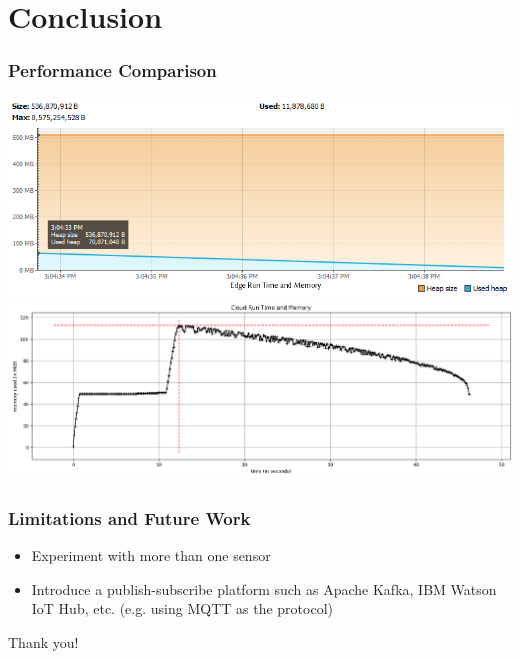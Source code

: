 \documentclass[xelatex,usenames,dvipsnames]{beamer}
\begin{document}
  \section{Conclusion}
  \begin{frame}[standout]
    \frametitle{Performance Comparison}
    
    \includegraphics[width = \textwidth]{figs/Edgent_Run_Time_Memory.png}
    \includegraphics[width = \textwidth]{figs/Cloud_Run_Time_Memory.png}
    
  
  \end{frame}

  \begin{frame}
    \frametitle{Limitations and Future Work}
    \begin{itemize}
      \item Experiment with more than one sensor
      \item Introduce a publish-subscribe platform such as Apache Kafka, IBM Watson IoT Hub, etc. (e.g. using MQTT as the protocol)
    \end{itemize}
    
  
  \end{frame}






  
  \begin{frame}[standout]
    Thank you!
  \end{frame}
  
\end{document}
